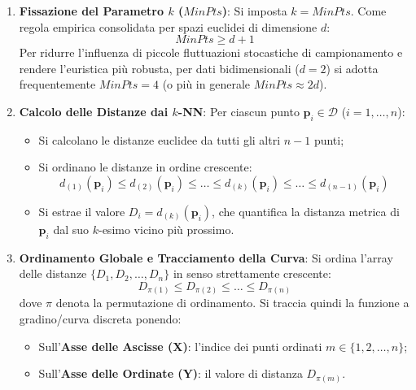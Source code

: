 \begin{enumerate}
    \item \textbf{Fissazione del Parametro $k$ ($MinPts$)}:
    Si imposta $k = MinPts$. Come regola empirica consolidata per spazi euclidei di dimensione $d$:
    \begin{equation}
        MinPts \ge d + 1
    \end{equation}
    Per ridurre l'influenza di piccole fluttuazioni stocastiche di campionamento e rendere l'euristica più robusta, per dati bidimensionali ($d = 2$) si adotta frequentemente $MinPts = 4$ (o più in generale $MinPts \approx 2d$).

    \item \textbf{Calcolo delle Distanze dai $k$-NN}:
    Per ciascun punto $\mathbf{p}_i \in \mathcal{D}$ ($i = 1, \dots, n$):
    \begin{itemize}[noitemsep]
        \item Si calcolano le distanze euclidee da tutti gli altri $n-1$ punti;
        \item Si ordinano le distanze in ordine crescente:
        \begin{equation}
            d_{(1)}(\mathbf{p}_i) \le d_{(2)}(\mathbf{p}_i) \le \dots \le d_{(k)}(\mathbf{p}_i) \le \dots \le d_{(n-1)}(\mathbf{p}_i)
        \end{equation}
        \item Si estrae il valore $D_i = d_{(k)}(\mathbf{p}_i)$, che quantifica la distanza metrica di $\mathbf{p}_i$ dal suo $k$-esimo vicino più prossimo.
    \end{itemize}

    \item \textbf{Ordinamento Globale e Tracciamento della Curva}:
    Si ordina l'array delle distanze $\{D_1, D_2, \dots, D_n\}$ in senso strettamente crescente:
    \begin{equation}
        D_{\pi(1)} \le D_{\pi(2)} \le \dots \le D_{\pi(n)}
    \end{equation}
    dove $\pi$ denota la permutazione di ordinamento.
    Si traccia quindi la funzione a gradino/curva discreta ponendo:
    \begin{itemize}[noitemsep]
        \item Sull'\textbf{Asse delle Ascisse (X)}: l'indice dei punti ordinati $m \in \{1, 2, \dots, n\}$;
        \item Sull'\textbf{Asse delle Ordinate (Y)}: il valore di distanza $D_{\pi(m)}$.
    \end{itemize}


\end{enumerate}
